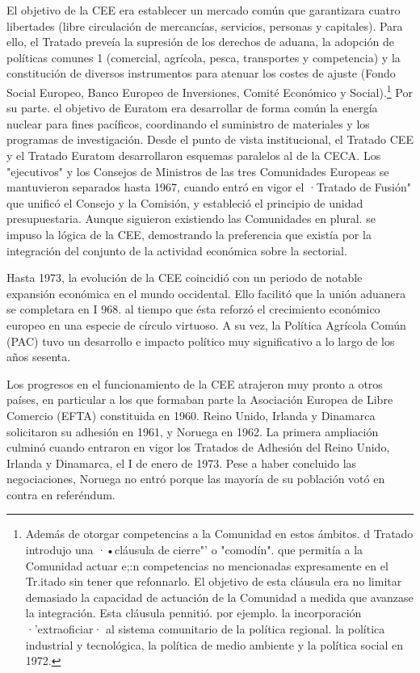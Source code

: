 \documentclass[10pt,a4paper]{article}
\begin{document}
El objetivo de la CEE era establecer un mercado común que garantizara cuatro libertades (libre circulación de mercancías, servicios, personas y capitales). Para ello, el Tratado preveía la supresión de los derechos de aduana, la adopción de políticas comunes 1 (comercial, agrícola, pesca, transportes y competencia) y la constitución de diversos instrumentos para atenuar los costes de ajuste (Fondo Social Europeo, Banco Europeo de Inversiones, Comité Económico y Social).\footnote{%
    Además de otorgar competencias a la Comunidad en estos ámbitos. d Tratado introdujo una ·•cláusula de cierre"' o "comodín". que permitía a la Comunidad actuar e;:n competencias no mencionadas expresamente en el Tr.itado sin tener que refonnarlo. El objetivo de esta cláusula era no limitar demasiado la capacidad de actuación de la Comunidad a medida que avanzase la integración. Esta cláusula pennitió. por ejemplo. la incorporación ·'extraoficiar· al sistema comunitario de la política regional. la política industrial y tecnológica, la política de medio ambiente y la política social en 1972.
} Por su parte. el objetivo de Euratom era desarrollar de forma común la energía nuclear para fines pacíficos, coordinando el suministro de materiales y los programas de investigación. Desde el punto de vista institucional, el Tratado CEE y el Tratado Euratom desarrollaron esquemas paralelos al de la CECA. Los "ejecutivos" y los Consejos de Ministros de las tres Comunidades Europeas se mantuvieron separados hasta 1967, cuando entró en vigor el ·Tratado de Fusión" que unificó el Consejo y la Comisión, y estableció el principio de unidad presupuestaria. Aunque siguieron existiendo las Comunidades en plural. se impuso la lógica de la CEE, demostrando la preferencia que existía por la integración del conjunto de la actividad económica sobre la sectorial.

Hasta 1973, la evolución de la CEE coincidió con un periodo de notable expansión económica en el mundo occidental. Ello facilitó que la unión aduanera se completara en I 968. al tiempo que ésta reforzó el crecimiento económico europeo en una especie de círculo virtuoso. A su vez, la Política Agrícola Común (PAC) tuvo un desarrollo e impacto político muy significativo a lo largo de los años sesenta.

Los progresos en el funcionamiento de la CEE atrajeron muy pronto a otros países, en particular a los que formaban parte la Asociación Europea de Libre Comercio (EFTA) constituida en 1960. Reino Unido, Irlanda y Dinamarca solicitaron su adhesión en 1961, y Noruega en 1962. La primera ampliación culminó cuando entraron en vigor los Tratados de Adhesión del Reino Unido, Irlanda y Dinamarca, el I de enero de 1973. Pese a haber concluido las negociaciones, Noruega no entró porque las mayoría de su población votó en contra en referéndum.
\end{document}
